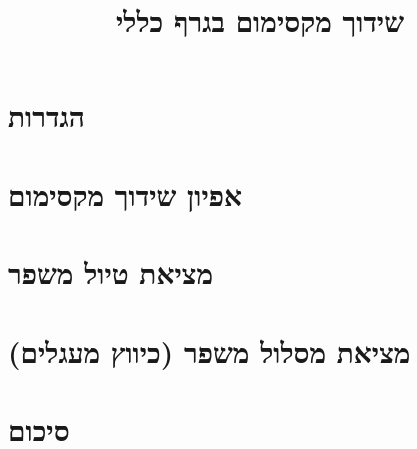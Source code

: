 \documentclass[]{article}
\title{שידוך מקסימום בגרף כללי}
\author{}
\date{}
\begin{document}
\maketitle

\section{הגדרות}

\section{אפיון שידוך מקסימום}

\section{מציאת טיול משפר}

\newpage
\section{
מציאת מסלול משפר (כיווץ מעגלים) 
}

\section{סיכום}

\end{document}
